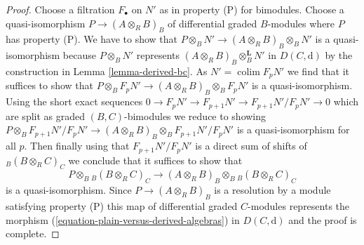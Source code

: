 \documentclass{stacks-project}
\theoremstyle{plain}
\theoremstyle{definition}
\theoremstyle{remark}
\numberwithin{equation}{subsection}
\def\colim{\mathop{\mathrm{colim}}\nolimits}
\begin{document}
\begin{proof}
\medskip\noindent
Choose a filtration $F_\bullet$ on $N'$ as in property (P) for bimodules.
Choose a quasi-isomorphism $P \to (A \otimes_R B)_B$
of differential graded $B$-modules where $P$ has property (P).
We have to show that
$P \otimes_B N' \to (A \otimes_R B)_B \otimes_B N'$ is
a quasi-isomorphism because $P \otimes_B N'$ represents
$(A \otimes_R B)_B \otimes_B^\mathbf{L} N'$ in $D(C, \text{d})$
by the construction in Lemma \ref{lemma-derived-bc}.
As $N' = \colim F_pN'$ we find
that it suffices to show that
$P \otimes_B F_pN' \to (A \otimes_R B)_B \otimes_B F_pN'$
is a quasi-isomorphism. Using the short exact sequences
$0 \to F_pN' \to F_{p + 1}N' \to F_{p + 1}N'/F_pN' \to 0$
which are split as graded $(B, C)$-bimodules we reduce to showing
$P \otimes_B F_{p + 1}N'/F_pN' \to
(A \otimes_R B)_B \otimes_B F_{p + 1}N'/F_pN'$
is a quasi-isomorphism for all $p$.
Then finally using that $F_{p + 1}N'/F_pN'$
is a direct sum of shifts of ${}_B(B \otimes_R C)_C$
we conclude that it suffices to show that
$$
P \otimes_B {}_B(B \otimes_R C)_C \to
(A \otimes_R B)_B \otimes_B {}_B(B \otimes_R C)_C
$$
is a quasi-isomorphism. Since $P \to (A \otimes_R B)_B$
is a resolution by a module satisfying property (P)
this map of differential graded $C$-modules
represents the morphism (\ref{equation-plain-versus-derived-algebras})
in $D(C, \text{d})$ and the proof is complete.
\end{proof}
\end{document}
